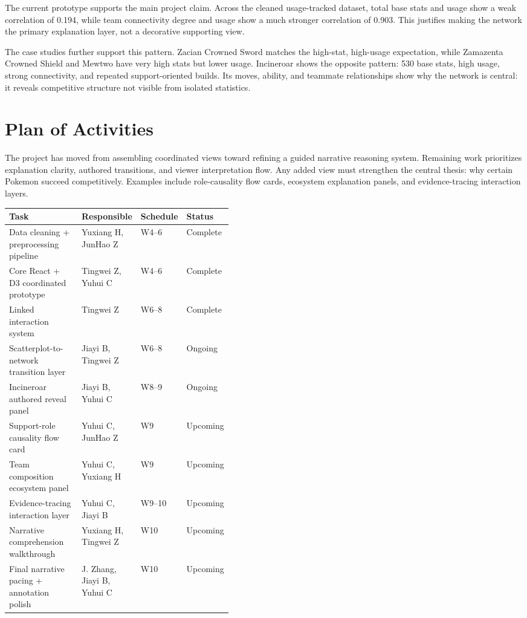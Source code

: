 \documentclass[11pt]{article}
\begin{document}
The current prototype supports the main project claim. Across the cleaned usage-tracked dataset, total base stats and usage show a weak correlation of 0.194, while team connectivity degree and usage show a much stronger correlation of 0.903. This justifies making the network the primary explanation layer, not a decorative supporting view.

The case studies further support this pattern. Zacian Crowned Sword matches the high-stat, high-usage expectation, while Zamazenta Crowned Shield and Mewtwo have very high stats but lower usage. Incineroar shows the opposite pattern: 530 base stats, high usage, strong connectivity, and repeated support-oriented builds. Its moves, ability, and teammate relationships show why the network is central: it reveals competitive structure not visible from isolated statistics.
\section{Plan of Activities}

The project has moved from assembling coordinated views toward refining a guided narrative reasoning system. Remaining work prioritizes explanation clarity, authored transitions, and viewer interpretation flow. Any added view must strengthen the central thesis: why certain Pokemon succeed competitively. Examples include role-causality flow cards, ecosystem explanation panels, and evidence-tracing interaction layers.

{\small
\setlength{\tabcolsep}{3pt}
\renewcommand{\arraystretch}{0.9}
\begin{tabularx}{\linewidth}{@{}>{\raggedright\arraybackslash}X >{\raggedright\arraybackslash}p{0.25\linewidth} >{\centering\arraybackslash}p{0.08\linewidth} >{\raggedright\arraybackslash}p{0.10\linewidth}@{}}
\toprule
Task & Responsible & Schedule & Status \\
\midrule
Data cleaning + preprocessing pipeline & Yuxiang H, JunHao Z & W4--6 & Complete \\
Core React + D3 coordinated prototype & Tingwei Z, Yuhui C & W4--6 & Complete \\
Linked interaction system & Tingwei Z & W6--8 & Complete \\
Scatterplot-to-network transition layer & Jiayi B, Tingwei Z & W6--8 & Ongoing \\
Incineroar authored reveal panel & Jiayi B, Yuhui C & W8--9 & Ongoing \\
Support-role causality flow card & Yuhui C, JunHao Z & W9 & Upcoming \\
Team composition ecosystem panel & Yuhui C, Yuxiang H & W9 & Upcoming \\
Evidence-tracing interaction layer & Yuhui C, Jiayi B & W9--10 & Upcoming \\
Narrative comprehension walkthrough & Yuxiang H, Tingwei Z & W10 & Upcoming \\
Final narrative pacing + annotation polish & J. Zhang, Jiayi B, Yuhui C & W10 & Upcoming \\
\bottomrule
\end{tabularx}
}
\vspace{-0.35em}
\end{document}
